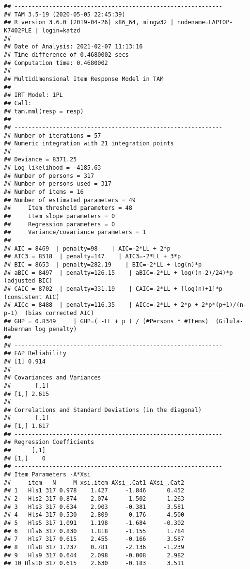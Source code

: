 \documentclass[
]{book}
\begin{document}
\begin{verbatim}
## ------------------------------------------------------------
## TAM 3.5-19 (2020-05-05 22:45:39) 
## R version 3.6.0 (2019-04-26) x86_64, mingw32 | nodename=LAPTOP-K7402PLE | login=katzd 
## 
## Date of Analysis: 2021-02-07 11:13:16 
## Time difference of 0.4680002 secs
## Computation time: 0.4680002 
## 
## Multidimensional Item Response Model in TAM 
## 
## IRT Model: 1PL
## Call:
## tam.mml(resp = resp)
## 
## ------------------------------------------------------------
## Number of iterations = 57 
## Numeric integration with 21 integration points
## 
## Deviance = 8371.25 
## Log likelihood = -4185.63 
## Number of persons = 317 
## Number of persons used = 317 
## Number of items = 16 
## Number of estimated parameters = 49 
##     Item threshold parameters = 48 
##     Item slope parameters = 0 
##     Regression parameters = 0 
##     Variance/covariance parameters = 1 
## 
## AIC = 8469  | penalty=98    | AIC=-2*LL + 2*p 
## AIC3 = 8518  | penalty=147    | AIC3=-2*LL + 3*p 
## BIC = 8653  | penalty=282.19    | BIC=-2*LL + log(n)*p 
## aBIC = 8497  | penalty=126.15    | aBIC=-2*LL + log((n-2)/24)*p  (adjusted BIC) 
## CAIC = 8702  | penalty=331.19    | CAIC=-2*LL + [log(n)+1]*p  (consistent AIC) 
## AICc = 8488  | penalty=116.35    | AICc=-2*LL + 2*p + 2*p*(p+1)/(n-p-1)  (bias corrected AIC) 
## GHP = 0.8349     | GHP=( -LL + p ) / (#Persons * #Items)  (Gilula-Haberman log penalty) 
## 
## ------------------------------------------------------------
## EAP Reliability
## [1] 0.914
## ------------------------------------------------------------
## Covariances and Variances
##       [,1]
## [1,] 2.615
## ------------------------------------------------------------
## Correlations and Standard Deviations (in the diagonal)
##       [,1]
## [1,] 1.617
## ------------------------------------------------------------
## Regression Coefficients
##      [,1]
## [1,]    0
## ------------------------------------------------------------
## Item Parameters -A*Xsi
##     item   N     M xsi.item AXsi_.Cat1 AXsi_.Cat2
## 1   Hls1 317 0.978    1.427     -1.846      0.452
## 2   Hls2 317 0.874    2.074     -1.502      1.263
## 3   Hls3 317 0.634    2.903     -0.381      3.581
## 4   Hls4 317 0.530    2.809      0.176      4.500
## 5   Hls5 317 1.091    1.198     -1.684     -0.302
## 6   Hls6 317 0.830    1.818     -1.155      1.784
## 7   Hls7 317 0.615    2.455     -0.166      3.587
## 8   Hls8 317 1.237    0.781     -2.136     -1.239
## 9   Hls9 317 0.644    2.098     -0.008      2.982
## 10 Hls10 317 0.615    2.630     -0.183      3.511

\end{verbatim}
\end{document}
